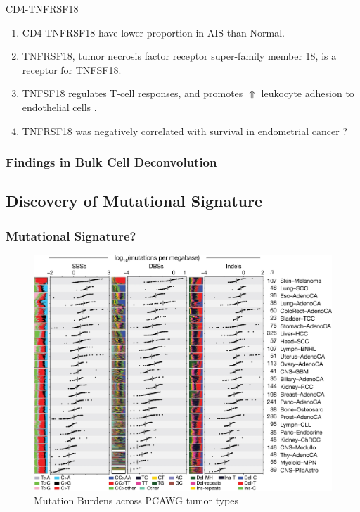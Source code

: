 \documentclass{beamer}
\begin{document}
\begin{frame}[allowframebreaks]
        \begin{block}{CD4-TNFRSF18}
            \begin{enumerate}
                \item CD4-TNFRSF18 have lower proportion in AIS than Normal.
                \item TNFRSF18, tumor necrosis factor receptor super-family member 18, is a receptor for TNFSF18.
                \item TNFSF18 regulates T-cell responses, and promotes $\Uparrow$ leukocyte adhesion to endothelial cells \cite{TNFRSF18-1}.
                \item TNFRSF18 was negatively correlated with survival in endometrial cancer \cite{TNFRSF18-2}?
            \end{enumerate}
        \end{block}
    \end{frame}

    \begin{frame}
        \frametitle{Findings in Bulk Cell Deconvolution}
    \end{frame}

        \subsection{Discovery of Mutational Signature}
    \begin{frame}
        \frametitle{Mutational Signature?}

        \begin{figure}
            \includegraphics[width=0.6 \linewidth]{figures/LungCancer/signatures.jpg}
            \caption{Mutation Burdens across PCAWG tumor types \protect\cite{signature1}}
        \end{figure}
    \end{frame}
\end{document}
